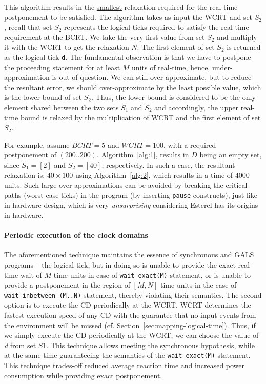 This algorithm results in the \underline{smallest} relaxation required
for the real-time postponement to be satisfied. The algorithm takes as
input the WCRT and set $S_2$, recall that set $S_2$ represents the
logical ticks required to satisfy the real-time requirement at the
BCRT. We take the very first value from set $S_2$ and multiply it with
the WCRT to get the relaxation $N$. The first element of set $S_2$ is
returned as the logical tick \texttt{d}. The fundamental observation is
that we have to postpone the proceeding statement for at least $M$ units
of real-time, hence, under-approximation is out of question. We can
still over-approximate, but to reduce the resultant error, we should
over-approximate by the least possible value, which is the lower bound
of set $S_2$. Thus, the lower bound is considered to be the only element
shared between the two sets $S_1$ and $S_2$ and accordingly, the upper
real-time bound is relaxed by the multiplication of WCRT and the first
element of set $S_2$.

For example, assume $BCRT=5$ and $WCRT=100$, with a required
postponement of $(200..200)$. Algorithm~\ref{alg:1}, results in $D$
being an empty set, since $S_1=[2]$ and $S_2=[40]$, respectively. In
such a case, the resultant relaxation is: $40 \times 100$ using
Algorithm~\ref{alg:2}, which results in a time of $4000$ units. Such
large over-approximations can be avoided by breaking the critical paths
(worst case ticks) in the program (by inserting \texttt{pause}
constructs), just like in hardware design, which is very
\textit{unsurprising} considering Esterel has its origins in hardware.

\paragraph{Periodic execution of the clock domains}
\label{sec:peri-exec-clock}

The aforementioned technique maintains the essence of synchronous and
GALS programs -- the logical tick, but in doing so is unable to provide
the exact real-time wait of $M$ time units in case of
\texttt{wait\_exact(M)} statement, or is unable to provide a
postponement in the region of $[M, N]$ time units in the case of
\texttt{wait\_inbetween (M..N)} statement, thereby violating their
semantics. The second option is to execute the CD periodically at the
WCRT. WCRT determines the fastest execution speed of any CD with the
guarantee that no input events from the environment will be missed
(cf. Section~\ref{sec:mapping-logical-time}). Thus, if we simply execute
the CD periodically at the WCRT, we can choose the value of \textit{d}
from set $S1$. This technique allows meeting the synchronous hypothesis,
while at the same time guaranteeing the semantics of the
\texttt{wait\_exact(M)} statement. This technique trades-off reduced
average reaction time and increased power consumption while providing
exact postponement.

